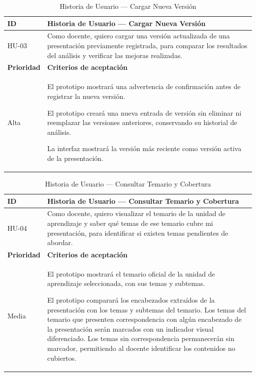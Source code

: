 \documentclass[11pt]{article}
\newcommand{\ttstyle}{%
  \small
  \setlength{\tabcolsep}{6pt}%
  \renewcommand{\arraystretch}{1.25}%
  \arrayrulecolor{azulprofundo}%
}
\newcommand{\hairrule}{%
  \arrayrulecolor{azulregla}\midrule[0.3pt]\arrayrulecolor{azulprofundo}%
}
\begin{document}
\begin{table}[H]
    \centering
    \renewcommand{\arraystretch}{1.2}
    \ttstyle
    \begin{tabular}{p{2.5cm}p{11cm}}
        \toprule
        \textbf{ID} & \textbf{Historia de Usuario --- Cargar Nueva Versión} \\
        \midrule
        HU-03 & Como docente, quiero cargar una versión actualizada de una presentación previamente registrada, para comparar los resultados del análisis y verificar las mejoras realizadas. \\
        \hairrule
        \textbf{Prioridad} & \textbf{Criterios de aceptación} \\
        \hairrule
        Alta & El prototipo mostrará una advertencia de confirmación antes de registrar la nueva versión. 
        
        El prototipo creará una nueva entrada de versión sin eliminar ni reemplazar las versiones anteriores, conservando su historial de análisis. 
        
        La interfaz mostrará la versión más reciente como versión activa de la presentación. \\
        \bottomrule
    \end{tabular}
    \caption{ Historia de Usuario — Cargar Nueva Versión}
    \label{tab:hu-cargar-nueva-version}
\end{table}


\begin{table}[H]
    \centering
    \renewcommand{\arraystretch}{1.2}
    \ttstyle
    \begin{tabular}{p{2.5cm}p{11cm}}
        \toprule
        \textbf{ID} & \textbf{Historia de Usuario --- Consultar Temario y Cobertura} \\
        \midrule
        HU-04 & Como docente, quiero visualizar el temario de la unidad de aprendizaje y saber qué temas de ese temario cubre mi presentación, para identificar si existen temas pendientes de abordar. \\
        \hairrule
        \textbf{Prioridad} & \textbf{Criterios de aceptación} \\
        \hairrule
        Media & El prototipo mostrará el temario oficial de la unidad de aprendizaje seleccionada, con sus temas y subtemas. 
        
        El prototipo comparará los encabezados extraídos de la presentación con los temas y subtemas del temario. Los temas del temario que presenten correspondencia con algún encabezado de la presentación serán marcados con un indicador visual diferenciado. Los temas sin correspondencia permanecerán sin marcador, permitiendo al docente identificar los contenidos no cubiertos. \\
        \bottomrule
    \end{tabular}
    \caption{Historia de Usuario — Consultar Temario y Cobertura}
    \label{tab:hu-consultar-temario-cobertura}
\end{table}
\end{document}
